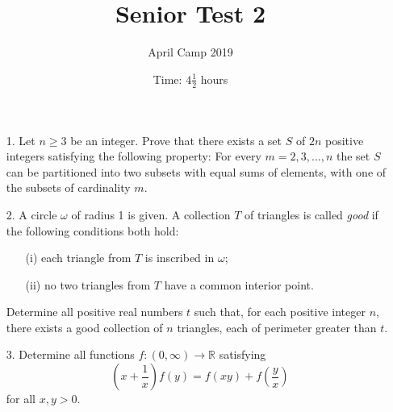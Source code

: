 \documentclass[a4paper, 12pt]{article}
\title{Senior Test 2}
\author{April Camp 2019}
\date{Time: $4 \frac{1}{2}$ hours}
\begin{document}
 \maketitle \vspace{24pt}

\begin{enumerate}

\item[1.]  Let $n \geq 3$ be an integer. Prove that there exists a set $S$ of $2n$ positive integers satisfying the following property: For every $m = 2, 3, \dots, n$ the set $S$ can be partitioned into two subsets with equal sums of elements, with one of the subsets of cardinality $m$.


\vspace{24pt}
\item[2.]  A circle $\omega$ of radius 1 is given. A collection $T$ of triangles is called \emph{good} if the following conditions both hold:
\begin{enumerate}
  \item[(i)]  each triangle from $T$ is inscribed in $\omega$;
  \item[(ii)]  no two triangles from $T$ have a common interior point. 
\end{enumerate}

Determine all positive real numbers $t$ such that, for each positive integer $n$, there exists a good collection of $n$ triangles, each of perimeter greater than $t$.


\vspace{24pt}
\item[3.]  Determine all functions $f : \left(0,\infty\right) \to \mathbb{R}$ satisfying
\[ \left(x+\frac{1}{x}\right) f(y) = f\left(xy\right) +f\left(\frac{y}{x}\right) \]
for all $x,y > 0$. 

\end{enumerate}
\end{document}
